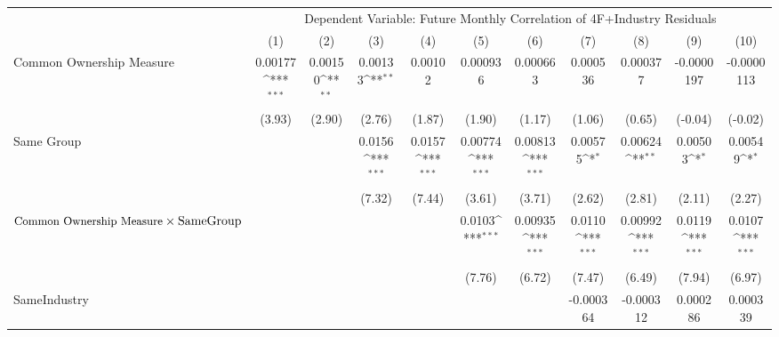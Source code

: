 {
\def\sym#1{\ifmmode^{#1}\else\(^{#1}\)\fi}
\begin{tabular}{l*{10}{c}}
\hline\hline
                &\multicolumn{10}{c}{Dependent Variable: Future Monthly Correlation of 4F+Industry Residuals}                                                                                                 \\\cmidrule(lr){2-11}
                &\multicolumn{1}{c}{(1)}         &\multicolumn{1}{c}{(2)}         &\multicolumn{1}{c}{(3)}         &\multicolumn{1}{c}{(4)}         &\multicolumn{1}{c}{(5)}         &\multicolumn{1}{c}{(6)}         &\multicolumn{1}{c}{(7)}         &\multicolumn{1}{c}{(8)}         &\multicolumn{1}{c}{(9)}         &\multicolumn{1}{c}{(10)}         \\
\hline
Common Ownership Measure&  0.00177\sym{***}&  0.00150\sym{**} &  0.00133\sym{**} &  0.00102         & 0.000936         & 0.000663         & 0.000536         & 0.000377         &-0.0000197         &-0.0000113         \\
                &   (3.93)         &   (2.90)         &   (2.76)         &   (1.87)         &   (1.90)         &   (1.17)         &   (1.06)         &   (0.65)         &  (-0.04)         &  (-0.02)         \\
[1em]
Same Group      &                  &                  &   0.0156\sym{***}&   0.0157\sym{***}&  0.00774\sym{***}&  0.00813\sym{***}&  0.00575\sym{*}  &  0.00624\sym{**} &  0.00503\sym{*}  &  0.00549\sym{*}  \\
                &                  &                  &   (7.32)         &   (7.44)         &   (3.61)         &   (3.71)         &   (2.62)         &   (2.81)         &   (2.11)         &   (2.27)         \\
[1em]
 $ \text{\small Common Ownership Measure} \times {\text{SameGroup} }$ &                  &                  &                  &                  &   0.0103\sym{***}&  0.00935\sym{***}&   0.0110\sym{***}&  0.00992\sym{***}&   0.0119\sym{***}&   0.0107\sym{***}\\
                &                  &                  &                  &                  &   (7.76)         &   (6.72)         &   (7.47)         &   (6.49)         &   (7.94)         &   (6.97)         \\
[1em]
SameIndustry    &                  &                  &                  &                  &                  &                  &-0.000364         &-0.000312         & 0.000286         & 0.000339         \\

\end{tabular}}
